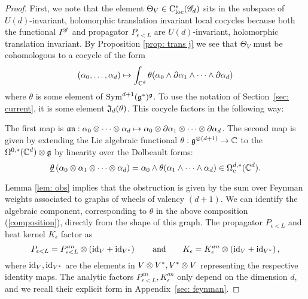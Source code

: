 \begin{proof}
First, we note that the element $\Theta_V \in {\rm C}_{\rm loc}^*(\mathscr G_d)$ sits in the subspace of $U(d)$-invariant, holomorphic translation invariant local cocycles because both the functional $I^{\mathscr G}$ and propagator $P_{\epsilon<L}$ are $U(d)$-invariant, holomorphic translation invariant.
By Proposition \ref{prop: trans j} we see that $\Theta_V$ must be cohomologous to a cocycle of the form
\[
(\alpha_0, \ldots, \alpha_d) \mapsto \int_{\mathbb C^d} \theta(\alpha_0 \wedge \partial \alpha_1 \wedge \cdots \wedge \partial \alpha_d) 
\]
where $\theta$ is some element of ${\rm Sym}^{d+1}(\mathfrak g^*)^\mathfrak g$.
To use the notation of Section~\ref{sec: current}, it is some element $\mathfrak J_d (\theta)$. 
This cocycle factors in the following way:
\beqn
\label{composition}
\eeqn
The first map is $\mathfrak a \mathfrak n : \alpha_0 \otimes \cdots \otimes \alpha_d \mapsto \alpha_0 \otimes \partial \alpha_1 \otimes \cdots \otimes \partial \alpha_d$.
The second map is given by extending the Lie algebraic functional $\theta : \mathfrak g^{\otimes (d+1)} \to \mathbb C$ to the $\Omega^{0,*}(\mathbb C^d) \otimes \mathfrak g$ by linearity over the Dolbeault forms:
\[
\underline{\theta} \left(\alpha_0 \otimes \alpha_1 \otimes \cdots \otimes \alpha_d\right) = \alpha_0 \wedge \theta(\alpha_1 \wedge \cdots \wedge \alpha_d) \in \Omega^{d,*}_c(\mathbb C^d).
\]

Lemma \ref{lem: obs} implies that the obstruction is given by the sum over Feynman weights associated to graphs of wheels of valency $(d+1)$.
We can identify the algebraic component, corresponding to $\theta$ in the above composition (\ref{composition}), directly from the shape of this graph. 
The propagator $P_{\epsilon<L}$ and heat kernel $K_\epsilon$ factor as
\[
P_{\epsilon<L} = P^{an}_{\epsilon<L} \otimes \left({\rm id}_{V} + {\rm id}_{V^*}\right)
\quad\quad\text{and}\quad\quad 
K_{\epsilon} = K_{\epsilon}^{an} \otimes \left({\rm id}_{V} + {\rm id}_{V^*}\right),
\]
where ${\rm id}_V, {\rm id}_{V^*}$ are the elements in $V \otimes V^*, V^* \otimes V$ representing the respective identity maps. 
The analytic factors $P^{an}_{\epsilon<L},  K_{\epsilon}^{an}$ only depend on the dimension $d$, and we recall their explicit form in Appendix~\ref{sec: feynman}. 


\end{proof}
